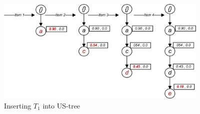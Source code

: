 %
%
\begin{figure}
  \centering
	\includegraphics[width=.4\textwidth,height=5cm]{images/sim_01.jpg}  
	\caption{Inserting $T_1$ into US-tree}
	\label{figure:t1}
\end{figure}

